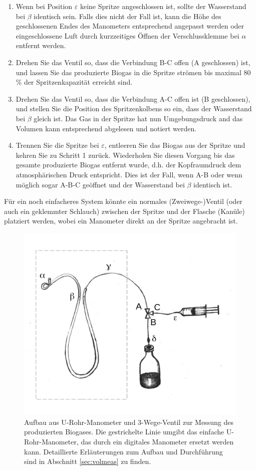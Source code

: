 \documentclass[]{article}
\begin{document}
\begin{enumerate}
  \item Wenn bei Position $\varepsilon$ keine Spritze angeschlossen ist, sollte der Wasserstand bei $\beta$ identisch sein. Falls dies nicht der Fall ist, kann die Höhe des geschlossenen Endes des Manometers entsprechend angepasst werden oder eingeschlossene Luft durch kurzzeitiges Öffnen der Verschlussklemme bei $\alpha$ entfernt werden.
  \item Drehen Sie das Ventil so, dass die Verbindung B-C offen (A geschlossen) ist, und lassen Sie das produzierte Biogas in die Spritze strömen bis maximal 80 \% der Spritzenkapazität erreicht sind.
  \item Drehen Sie das Ventil so, dass die Verbindung A-C offen ist (B geschlossen), und stellen Sie die Position des Spritzenkolbens so ein, dass der Wasserstand bei $\beta$ gleich ist. Das Gas in der Spritze hat nun Umgebungsdruck and das Volumen kann entsprechend abgelesen und notiert werden.
  \item Trennen Sie die Spritze bei $\varepsilon$, entleeren Sie das Biogas aus der Spritze und kehren Sie zu Schritt 1 zurück. Wiederholen Sie diesen Vorgang bis das gesamte produzierte Biogas entfernt wurde, d.h. der Kopfraumdruck dem atmosphärischen Druck entspricht. Dies ist der Fall, wenn A-B oder wenn möglich sogar A-B-C geöffnet und der Wasserstand bei $\beta$ identisch ist.
\end{enumerate}

Für ein noch einfacheres System könnte ein normales (Zweiwege-)Ventil (oder auch ein geklemmter Schlauch) zwischen der Spritze und der Flasche (Kanüle) platziert werden, wobei ein Manometer direkt an der Spritze angebracht ist.

\begin{figure}
  \includegraphics[]{figs/GD_utube.pdf}
  \caption{Aufbau aus U-Rohr-Manometer und 3-Wege-Ventil zur Messung des produzierten Biogases. Die gestrichelte Linie umgibt das einfache U-Rohr-Manometer, das durch ein digitales Manometer ersetzt werden kann. Detaillierte Erläuterungen zum Aufbau und Durchführung sind in Abschnitt \ref{sec:volmeas} zu finden.} 
  \label{fig:utube}
\end{figure}
\end{document}
